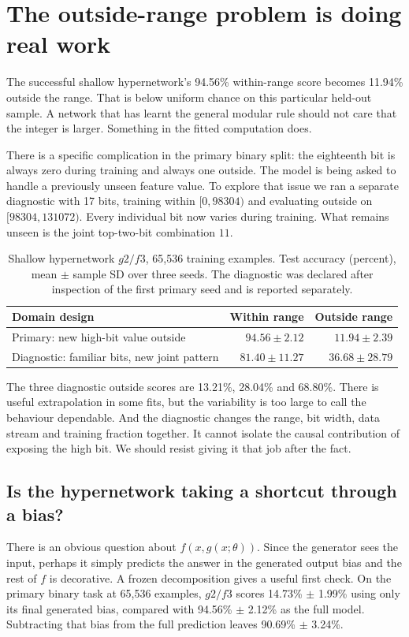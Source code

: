 \documentclass{article}
\begin{document}
\newpage
\section{The outside-range problem is doing real work}
The successful shallow hypernetwork's 94.56\% within-range score becomes
11.94\% outside the range. That is below uniform chance on this particular held-out
sample. A network that has learnt the general modular rule should not care that
the integer is larger. Something in the fitted computation does.

There is a specific complication in the primary binary split: the eighteenth bit
is always zero during training and always one outside. The model is being asked to
handle a previously unseen feature value. To explore that issue we ran a separate
diagnostic with 17 bits, training within $[0,98304)$ and evaluating outside on
$[98304,131072)$. Every individual bit now varies during training. What remains
unseen is the joint top-two-bit combination $11$.

\begin{table}[h!]
\centering
\caption{Shallow hypernetwork $g2/f3$, 65,536 training examples. Test accuracy
(percent), mean $\pm$ sample SD over three seeds. The diagnostic was declared after
inspection of the first primary seed and is reported separately.}
\small
\begin{tabular}{lrr}
\toprule
Domain design & Within range & Outside range\\
\midrule
Primary: new high-bit value outside & $94.56\pm2.12$ & $11.94\pm2.39$\\
Diagnostic: familiar bits, new joint pattern & $81.40\pm11.27$ & $36.68\pm28.79$\\
\bottomrule
\end{tabular}
\end{table}

The three diagnostic outside scores are 13.21\%, 28.04\% and 68.80\%. There is
useful extrapolation in some fits, but the variability is too large to call the
behaviour dependable. And the diagnostic changes the range, bit width, data stream
and training fraction together. It cannot isolate the causal contribution of
exposing the high bit. We should resist giving it that job after the fact.

\subsection{Is the hypernetwork taking a shortcut through a bias?}
There is an obvious question about $f(x,g(x;\theta))$. Since the generator sees the
input, perhaps it simply predicts the answer in the generated output bias and
the rest of $f$ is decorative. A frozen decomposition gives a useful first check.
On the primary binary task at 65,536 examples, $g2/f3$ scores 14.73\% $\pm$ 1.99\%
using only its final generated bias, compared with 94.56\% $\pm$ 2.12\% as the full
model. Subtracting that bias from the full prediction leaves 90.69\% $\pm$ 3.24\%.
\end{document}
